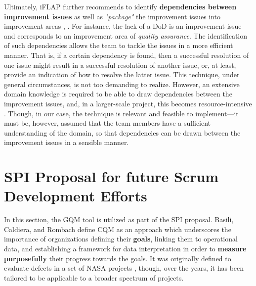 \documentclass[conference]{IEEEtran}
\begin{document}
Ultimately, iFLAP further recommends to identify \textbf{dependencies between
improvement issues} as well as \textit{"package"} the improvement issues into
improvement areas \cite{Pettersson2008}, \cite{Malvius2009}. For instance, the
lack of a DoD is an improvement issue and corresponds to an improvement area of
\textit{quality assurance}. The identification of such dependencies allows the
team to tackle the issues in a more efficient manner. That is, if a certain
dependency is found, then a successful resolution of one issue might result in
a successful resolution of another issue, or, at least, provide an indication
of how to resolve the latter issue. This technique, under general
circumstances, is not too demanding to realize. However, an extensive domain
knowledge is required to be able to draw dependencies between the improvement
issues, and, in a larger-scale project, this becomes resource-intensive
\cite{Pettersson2008}. Though, in our case, the technique is relevant and
feasible to implement---it must be, however, assumed that the team members have
a sufficient understanding of the domain, so that dependencies can be drawn
between the improvement issues in a sensible manner.


\section{SPI Proposal for future Scrum Development Efforts}
\label{sec:proposal}


In this section, the {\selectfont GQM} tool is utilized as part
of the SPI proposal. Basili, Caldiera, and Rombach \cite{Caldiera1994} define
CQM as an approach which underscores the importance of organizations defining
their \textbf{goals}, linking them to operational data, and establishing a
framework for data interpretation in order to \textbf{measure purposefully}
their progress towards the goals. It was originally defined to evaluate defects
in a set of NASA projects \cite{Caldiera1994}, though, over the years, it has
been tailored to be applicable to a broader spectrum of projects.
\end{document}
